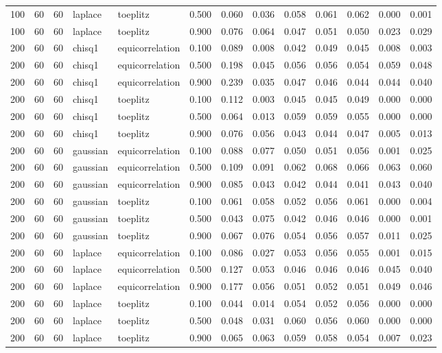 \begin{tabular}{rrrllrrrrrrrr}
100 & 60 & 60 & laplace & toeplitz & 0.500 & 0.060 & 0.036 & 0.058 & 0.061 & 0.062 & 0.000 & 0.001 \\
100 & 60 & 60 & laplace & toeplitz & 0.900 & 0.076 & 0.064 & 0.047 & 0.051 & 0.050 & 0.023 & 0.029 \\
200 & 60 & 60 & chisq1 & equicorrelation & 0.100 & 0.089 & 0.008 & 0.042 & 0.049 & 0.045 & 0.008 & 0.003 \\
200 & 60 & 60 & chisq1 & equicorrelation & 0.500 & 0.198 & 0.045 & 0.056 & 0.056 & 0.054 & 0.059 & 0.048 \\
200 & 60 & 60 & chisq1 & equicorrelation & 0.900 & 0.239 & 0.035 & 0.047 & 0.046 & 0.044 & 0.044 & 0.040 \\
200 & 60 & 60 & chisq1 & toeplitz & 0.100 & 0.112 & 0.003 & 0.045 & 0.045 & 0.049 & 0.000 & 0.000 \\
200 & 60 & 60 & chisq1 & toeplitz & 0.500 & 0.064 & 0.013 & 0.059 & 0.059 & 0.055 & 0.000 & 0.000 \\
200 & 60 & 60 & chisq1 & toeplitz & 0.900 & 0.076 & 0.056 & 0.043 & 0.044 & 0.047 & 0.005 & 0.013 \\
200 & 60 & 60 & gaussian & equicorrelation & 0.100 & 0.088 & 0.077 & 0.050 & 0.051 & 0.056 & 0.001 & 0.025 \\
200 & 60 & 60 & gaussian & equicorrelation & 0.500 & 0.109 & 0.091 & 0.062 & 0.068 & 0.066 & 0.063 & 0.060 \\
200 & 60 & 60 & gaussian & equicorrelation & 0.900 & 0.085 & 0.043 & 0.042 & 0.044 & 0.041 & 0.043 & 0.040 \\
200 & 60 & 60 & gaussian & toeplitz & 0.100 & 0.061 & 0.058 & 0.052 & 0.056 & 0.061 & 0.000 & 0.004 \\
200 & 60 & 60 & gaussian & toeplitz & 0.500 & 0.043 & 0.075 & 0.042 & 0.046 & 0.046 & 0.000 & 0.001 \\
200 & 60 & 60 & gaussian & toeplitz & 0.900 & 0.067 & 0.076 & 0.054 & 0.056 & 0.057 & 0.011 & 0.025 \\
200 & 60 & 60 & laplace & equicorrelation & 0.100 & 0.086 & 0.027 & 0.053 & 0.056 & 0.055 & 0.001 & 0.015 \\
200 & 60 & 60 & laplace & equicorrelation & 0.500 & 0.127 & 0.053 & 0.046 & 0.046 & 0.046 & 0.045 & 0.040 \\
200 & 60 & 60 & laplace & equicorrelation & 0.900 & 0.177 & 0.056 & 0.051 & 0.052 & 0.051 & 0.049 & 0.046 \\
200 & 60 & 60 & laplace & toeplitz & 0.100 & 0.044 & 0.014 & 0.054 & 0.052 & 0.056 & 0.000 & 0.000 \\
200 & 60 & 60 & laplace & toeplitz & 0.500 & 0.048 & 0.031 & 0.060 & 0.056 & 0.060 & 0.000 & 0.000 \\
200 & 60 & 60 & laplace & toeplitz & 0.900 & 0.065 & 0.063 & 0.059 & 0.058 & 0.054 & 0.007 & 0.023 \\
\bottomrule
\end{tabular}
